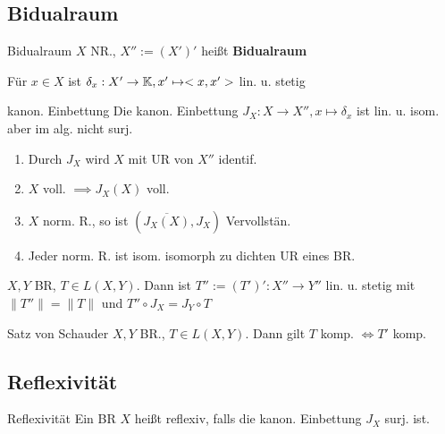 \subsection{Bidualraum}

\begin{definition}{Bidualraum}
    \(X\) NR., \(X'' := (X')'\) heißt \textbf{Bidualraum}
\end{definition}

\begin{bemerkung}
    Für \(x\in X\) ist \(\delta_x: X' \to \mathbb{K}, x'\mapsto <x,x'>\) lin. u. stetig
\end{bemerkung}

\begin{satz}{kanon. Einbettung}
    Die kanon. Einbettung \(J_X : X\to X'', x\mapsto \delta_x\) ist lin. u.
    isom. aber im alg. nicht surj.
\end{satz}

\begin{bemerkung}
    \begin{enumerate}[label=(\roman*)]
        \item Durch \(J_X\) wird \(X\) mit UR von \(X''\) identif.
        \item \(X\) voll. \(\implies J_X(X)\) voll.
        \item \(X\) norm. R., so ist \((\overline{J_X(X)}, J_X)\) Vervollstän.
        \item Jeder norm. R. ist isom. isomorph zu dichten UR eines BR.
    \end{enumerate}
\end{bemerkung}

\begin{lemma}
    \(X,Y\) BR, \(T\in L(X,Y)\). Dann ist \(T'' := (T')':X''\to Y''\) lin. u.
    stetig mit \(\|T''\| = \|T\|\) und \(T'' \circ J_X = J_Y \circ T \)
\end{lemma}

\begin{satz}{Satz von Schauder}
    \(X,Y\) BR., \(T\in L(X,Y)\). Dann gilt
    \(T\) komp. \(\Leftrightarrow T'\) komp.
\end{satz}


\subsection{Reflexivität}

\begin{definition}{Reflexivität}
    Ein BR \(X\) heißt reflexiv, falls die kanon. Einbettung \(J_X\) surj. ist.
\end{definition}

